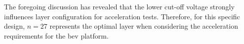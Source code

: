 

The foregoing  discussion has revealed  that the lower cut-off  voltage strongly
influences  layer  configuration for  acceleration  tests.  Therefore, for  this
specific design,  $n =  27$ represents  the optimal  layer when  considering the
acceleration requirements for the \gls{bev} platform.



